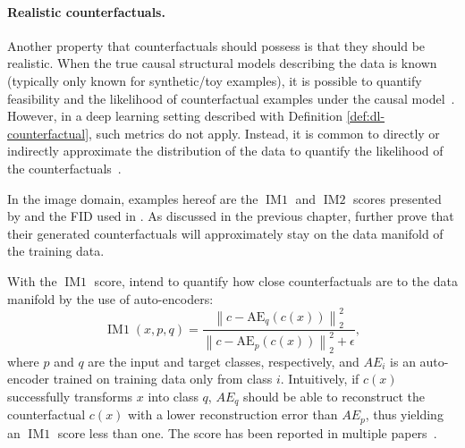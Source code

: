 \documentclass[11pt,a4paper,twoside,openright,final]{memoir}
\begin{document}
\paragraph{Realistic counterfactuals.} 
Another property that counterfactuals should possess is that they should be realistic.
When the true causal structural models describing the data is known (typically only known for synthetic/toy examples), it is possible to quantify feasibility and the likelihood of counterfactual examples under the causal model~\cite{Mahajan2019}. 
However, in a deep learning setting described with Definition \ref{def:dl-counterfactual}, such metrics do not apply. 
Instead, it is common to directly or indirectly approximate the distribution of the data to quantify the likelihood of the counterfactuals~\cite{VanLooveren2019, flowcounterfactuals, Singla2019, Rodriguez2021}.

In the image domain, examples hereof are the $\operatorname{IM1}$ and $\operatorname{IM2}$ scores presented by \citet{VanLooveren2019} and the FID used in \cite{Singla2019, Rodriguez2021}. 
As discussed in the previous chapter, \citet{flowcounterfactuals} further prove that their generated counterfactuals will approximately stay on the data manifold of the training data.

With the $\operatorname{IM1}$ score, \citet{VanLooveren2019} intend to quantify how close counterfactuals are to the data manifold by the use of auto-encoders:
\begin{equation} 
    \label{eq:IM1} 
  \operatorname{IM1}\left( x, p, q \right) = 
        \frac{
            \left\|c-\mathrm{AE}_{q}(c(x))\right\|_{2}^{2}}
        {
            \left\|c-\mathrm{AE}_{p}(c(x))\right\|_{2}^{2}+\epsilon
        },
\end{equation}
where $p$ and $q$ are the input and target classes, respectively, and $AE_i$ is an auto-encoder trained on training data only from class $i$. 
Intuitively, if $c(x)$ successfully transforms $x$ into class $q$, $AE_q$ should be able to reconstruct the counterfactual $c(x)$ with a lower reconstruction error than $AE_p$, thus yielding an $\operatorname{IM1}$ score less than one.
The score has been reported in multiple papers~\cite{VanLooveren2019, Mahajan2019, Schut2021}. 
\end{document}
